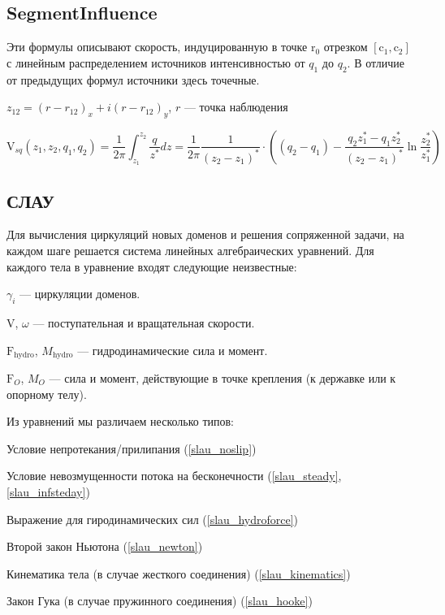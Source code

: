 \documentclass[a4paper,14pt]{extreport}
\newcommand{\br}[1]{\boldsymbol{\mathrm{#1}}}
\renewcommand{\vec}[1]{\br{#1}}
\newenvironment{packed_itemize}{
\begin{itemize}
  \setlength{\itemsep}{1pt}
  \setlength{\parskip}{0pt}
  \setlength{\parsep}{0pt}
}{\end{itemize}}
\begin{document}
\subsection{SegmentInfluence}
\label{SegmentInfluence}

Эти формулы описывают скорость, индуцированную в точке $\vec r_0$ отрезком $[\vec c_1, \vec c_2]$ с линейным распределением источников интенсивностью от $q_1$ до $q_2$. В отличие от предыдущих формул источники здесь точечные.

$z_{12} = (r - r_{12})_x + i (r-r_{12})_y$, $r$ --- точка наблюдения

\begin{equation}
\label{eq_SegmentInfluence_source}
\vec V_{sq} (z_1, z_2, q_1, q_2) = \dfrac{1}{2\pi}  \int_{z_1}^{z_2}\dfrac{q}{z^*} dz = \dfrac{1}{2\pi} \dfrac{1}{(z_2-z_1)^*} \cdot \left(  (q_2-q_1) - \dfrac{q_2 z_1^* - q_1 z_2^*}{(z_2-z_1)^*}\ln \dfrac{z_2^*}{z_1^*} \right)
\end{equation}

\subsection{СЛАУ}

Для вычисления циркуляций новых доменов и решения сопряженной задачи, на каждом шаге решается система линейных алгебраических уравнений. Для каждого тела в уравнение входят следующие неизвестные:
\begin{packed_itemize}
\item $\gamma_{i}$ --- циркуляции доменов.
\item $\vec V$, $\omega$ --- поступательная и вращательная скорости.
\item $\vec F_\text{hydro}$, $M_\text{hydro}$ --- гидродинамические сила и момент.
\item $\vec F_O$, $M_O$ --- сила и момент, действующие в точке крепления (к державке или к опорному телу).
\end{packed_itemize}

Из уравнений мы различаем несколько типов:
\begin{packed_itemize}
\item Условие непротекания/прилипания (\ref{slau_noslip})
\item Условие невозмущенности потока на бесконечности (\ref{slau_steady}, \ref{slau_infsteday})
\item Выражение для гиродинамических сил (\ref{slau_hydroforce})
\item Второй закон Ньютона (\ref{slau_newton})
\item Кинематика тела (в случае жесткого соединения) (\ref{slau_kinematics})
\item Закон Гука (в случае пружинного соединения) (\ref{slau_hooke})
\end{packed_itemize}
\end{document}
